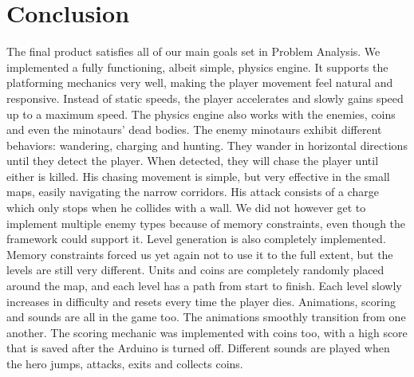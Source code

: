 \chapter{Conclusion}
The final product satisfies all of our main goals set in Problem Analysis. We implemented a fully functioning, albeit simple, physics engine. It supports the platforming mechanics very well, making the player movement feel natural and responsive. Instead of static speeds, the player accelerates and slowly gains speed up to a maximum speed. The physics engine also works with the enemies, coins and even the minotaurs' dead bodies.
\newline
The enemy minotaurs exhibit different behaviors: wandering, charging and hunting. They wander in horizontal directions until they detect the player. When detected, they will chase the player until either is killed. His chasing movement is simple, but very effective in the small maps, easily navigating the narrow corridors. His attack consists of a charge which only stops when he collides with a wall. We did not however get to implement multiple enemy types because of memory constraints, even though the framework could support it.
\newline
Level generation is also completely implemented. Memory constraints forced us yet again not to use it to the full extent, but the levels are still very different. Units and coins are completely randomly placed around the map, and each level has a path from start to finish. Each level slowly increases in difficulty and resets every time the player dies.
\newline
Animations, scoring and sounds are all in the game too. The animations smoothly transition from one another. The scoring mechanic was implemented with coins too, with a high score that is saved after the Arduino is turned off. Different sounds are played when the hero jumps, attacks, exits and collects coins.